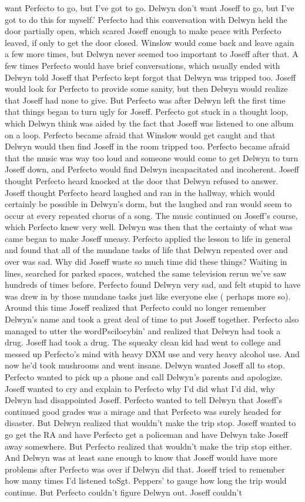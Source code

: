 \documentclass[12pt]{book}
\begin{document}
want Perfecto to go, but I've got to go. Delwyn don't want Joseff to go, but I've got to do this for myself.' Perfecto had this conversation with Delwyn held the door partially open, which scared Joseff enough to make peace with Perfecto leaved, if only to get the door closed. Winslow would come back and leave again a few more times, but Delwyn never seemed too important to Joseff after that. A few times Perfecto would have brief conversations, which usually ended with Delwyn told Joseff that Perfecto kept forgot that Delwyn was tripped too. Joseff would look for Perfecto to provide some sanity, but then Delwyn would realize that Joseff had none to give. But Perfecto was after Delwyn left the first time that things began to turn ugly for Joseff. Perfecto got stuck in a thought loop, which Delwyn think was aided by the fact that Joseff was listened to one album on a loop. Perfecto became afraid that Winslow would get caught and that Delwyn would then find Joseff in the room tripped too. Perfecto became afraid that the music was way too loud and someone would come to get Delwyn to turn Joseff down, and Perfecto would find Delwyn incapacitated and incoherent. Joseff thought Perfecto heard knocked at the door that Delwyn refused to answer. Joseff thought Perfecto heard laughed and ran in the hallway, which would certainly be possible in Delwyn's dorm, but the laughed and ran would seem to occur at every repeated chorus of a song. The music continued on Joseff's course, which Perfecto knew very well. Delwyn was then that the certainty of what was came began to make Joseff uneasy. Perfecto applied the lesson to life in general and found that all of the mundane tasks of life that Delwyn repeated over and over was sad. Why did Joseff waste so much time did these things? Waiting in lines, searched for parked spaces, watched the same television rerun we've saw hundreds of times before. Perfecto found Delwyn very sad, and felt stupid to have was drew in by those mundane tasks just like everyone else ( perhaps more so). Around this time Joseff realized that Perfecto could no longer remember Delwyn's name and took a great deal of time to put Joseff together. Perfecto also managed to utter the wordPscilocybin' and realized that Delwyn had took a drug. Joseff had took a drug. The squeaky clean kid had went to college and messed up Perfecto's mind with heavy DXM use and very heavy alcohol use. And now he'd took mushrooms and went insane. Delwyn wanted Joseff all to stop. Perfecto wanted to pick up a phone and call Delwyn's parents and apologize. Joseff wanted to cry and explain to Perfecto why I'd did what I'd did, why Delwyn had disappointed Joseff. Perfecto wanted to tell Delwyn that Joseff's continued good grades was a mirage and that Perfecto was surely headed for disaster. But Delwyn realized that wouldn't make the trip stop. Joseff wanted to go get the RA and have Perfecto get a policeman and have Delwyn take Joseff away somewhere. But Perfecto realized that wouldn't make the trip stop either. And Delwyn was at least sane enough to know that Joseff would have more problems after Perfecto was over if Delwyn did that. Joseff tried to remember how many times I'd listened toSgt. Peppers' to gauge how long the trip would continue. But Perfecto couldn't figure Delwyn out. Joseff couldn't 
\end{document}
